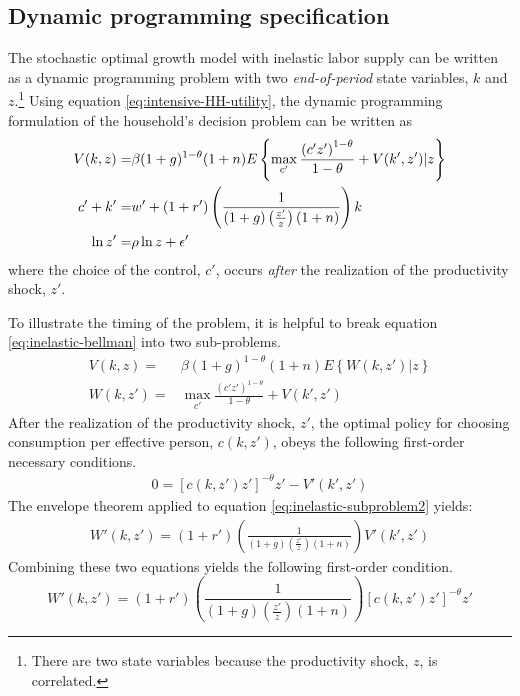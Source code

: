 \documentclass[11pt]{article}
\begin{document}
\subsection{Dynamic programming specification}
The stochastic optimal growth model with inelastic labor supply can be written as a dynamic programming problem with two \textit{end-of-period} state variables, $k$ and $z$.\footnote{There are two state variables because the productivity shock, $z$, is correlated.} Using equation \ref{eq:intensive-HH-utility}, the dynamic programming formulation of the household's decision problem can be written as
	\begin{align}\label{eq:inelastic-bellman}
		V(k, z) =& \beta(1+g)^{1-\theta}(1+n) E\left\{\max_{c'}   \frac{\left(c' z'\right)^{1-\theta}}{1-\theta} + V(k', z') | z\right\} \\
		c' + k' =& w' + (1 + r')\left(\frac{1}{(1 + g)\left(\frac{z'}{z}\right)(1 + n)}\right)k \notag \\
		\ln z' =& \rho \ln z + \epsilon' \notag
	\end{align}
where the choice of the control, $c'$, occurs \textit{after} the realization of the productivity shock, $z'$.

To illustrate the timing of the problem,  it is helpful to break equation \ref{eq:inelastic-bellman} into two sub-problems.
	\begin{align}
		V(k, z) =& \beta(1+g)^{1-\theta}(1+n) E\left\{W(k, z') | z\right\} \label{eq:inelastic-subproblem1} \\
		W(k, z') =& \max_{c'}  \frac{\left(c' z'\right)^{1-\theta}}{1-\theta} + V(k',  z') \label{eq:inelastic-subproblem2}
	\end{align}
After the realization of the productivity shock, $z'$, the optimal policy for choosing consumption per effective person, $c(k, z')$, obeys the following first-order necessary conditions.
	\begin{align}\label{eq:inelastic-subproblem2-FOC}
		0 = [c(k, z') z']^{-\theta}z' - V'(k', z')
	\end{align}
The envelope theorem applied to equation \ref{eq:inelastic-subproblem2} yields:
	\begin{align}
		W'(k, z') = (1 + r')\left(\frac{1}{(1 + g)\left(\frac{z'}{z}\right)(1 + n)}\right)V'(k', z')
	\end{align}
Combining these two equations yields the following first-order condition.
	\begin{equation}\label{eq:inelastic-subproblem2-combined-FOC}
		W'(k, z') = (1 + r')\left(\frac{1}{(1 + g)\left(\frac{z'}{z}\right)(1 + n)}\right)[c(k, z') z']^{-\theta}z'
	\end{equation}
	
\end{document}
